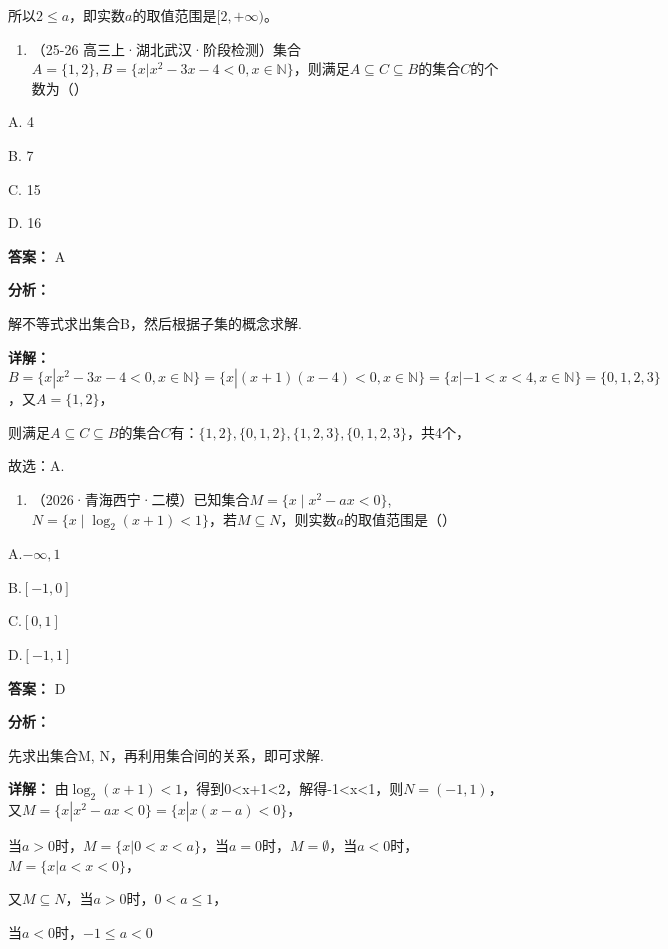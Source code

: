 \documentclass[11pt,a4paper]{ctexart}
\begin{document}
所以\(2 \leq a\)，即实数\(a\)的取值范围是\([2,+\infty)\)。

\begin{enumerate}[label=\arabic*., leftmargin=*, start=2]
\item （25-26
  高三上·湖北武汉·阶段检测）集合\(A = \{1,2\}, B = \{x|x^2 - 3x - 4 < 0, x \in \mathbb{N}\}\)，则满足\(A \subseteq C \subseteq B\)的集合\(C\)的个数为（）
\end{enumerate}

A. 4

B. 7

C. 15

D. 16

\textbf{答案：}
A

\textbf{分析：}

解不等式求出集合B，然后根据子集的概念求解.

\textbf{详解：}
\(B=\{x|x^{2}-3x-4<0,x\in \mathbb{N}\}=\{x|(x+1)(x-4)<0,x\in \mathbb{N}\}=\{x|-1<x<4,x\in \mathbb{N}\}=\{0,1,2,3\}\)，又\(A=\{1,2\}\)，

则满足\(A \subseteq C \subseteq B\)的集合\(C\)有：\(\{1,2\}, \{0,1,2\}, \{1,2,3\}, \{0,1,2,3\}\)，共4个，

故选：A.

\begin{enumerate}[label=\arabic*., leftmargin=*, start=3]
\item （2026·青海西宁·二模）已知集合\(M = \{x \mid x^2 - ax < 0\}\),\(N = \{x \mid \log_2(x + 1) < 1\}\)，若\(M \subseteq N\)，则实数\(a\)的取值范围是（）
\end{enumerate}

A.\(-\infty, 1\)

B.\([-1,0]\)

C.\([0,1]\)

D.\([-1, 1]\)

\textbf{答案：}
D

\textbf{分析：}

先求出集合M, N，再利用集合间的关系，即可求解.

\textbf{详解：}
由\(\log_{2}(x+1)<1\)，得到0\textless x+1\textless2，解得-1\textless x\textless1，则\(N=(-1,1)\)，又\(M=\{x|x^{2}-ax<0\}=\{x|x(x-a)<0\}\)，

当\(a > 0\)时，\(M = \{x | 0 < x < a\}\)，当\(a = 0\)时，\(M = \emptyset\)，当\(a < 0\)时，\(M = \{x | a < x < 0\}\)，

又\(M \subseteq N\)，当\(a > 0\)时，\(0 < a \leq 1\)，

当\(a < 0\)时，\(-1 \leq a < 0\)
\end{document}
